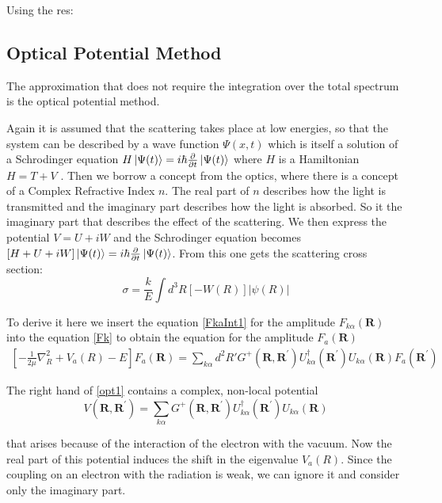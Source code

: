 Using the res:

\subsection{Optical Potential Method}

The approximation that does not require the integration over the total spectrum is the optical potential method. 

Again it is assumed that the scattering takes place at low energies, so that the system can be described by a wave function $ \Psi(x,t) $ which is itself a solution of a Schrodinger equation $ H\ket{\Psi(t)} = i\hbar\frac{\partial}{\partial t}\ket{\Psi(t)} $ where $ H $ is a Hamiltonian $ H = T + V $ .
Then we borrow a concept from the optics, where there is a concept of a Complex Refractive Index $ n $. The real part of $ n $ describes how the light is transmitted and the imaginary part describes how the light is absorbed. So it the imaginary part that describes the effect of the scattering. We then express the potential $ V = U + iW $  and the Schrodinger equation becomes $ \left[H + U + iW\right]\ket{\Psi(t)} = i\hbar\frac{\partial}{\partial t}\ket{\Psi(t)} $. From this one gets the scattering cross section:
\begin{equation}
\sigma = \frac{k}{E}\int{d^3R\left[-W(R)\right]\left| \psi(R) \right|}
\end{equation}

To derive it here we insert the equation \eqref{FkaInt1} for the amplitude $ F_{k\alpha}(\mathbf{R}) $ into the equation \eqref{Fk} to obtain the equation for the amplitude $ F_a(\mathbf{R}) $
\begin{equation}\label{opt1}
\begin{split}
\left[-\frac{1}{2\mu}\nabla_R^2 + V_a(R) - E \right]F_a(\mathbf{R}) = \sum_{k\alpha}{d^2R'G^{+}(\mathbf{R},\mathbf{R}^{'})U_{k\alpha}^{\dagger}(\mathbf{R}^{'})U_{k\alpha}(\mathbf{R})F_a(\mathbf{R}^{'})}
\end{split}
\end{equation}

The right hand of \eqref{opt1} contains a complex, non-local potential
\begin{equation}\label{optV1}
V(\mathbf{R},\mathbf{R}^{'}) = \sum_{k\alpha}{G^{+}(\mathbf{R},\mathbf{R}^{'})U_{k\alpha}^{\dagger}(\mathbf{R}^{'})U_{k\alpha}(\mathbf{R}) }
\end{equation}

that arises because of the interaction of the electron with the vacuum. Now the real part of this potential induces the shift in the eigenvalue $ V_a(R) $. Since the coupling on an electron with the radiation is weak, we can ignore it and consider only the imaginary part. 

